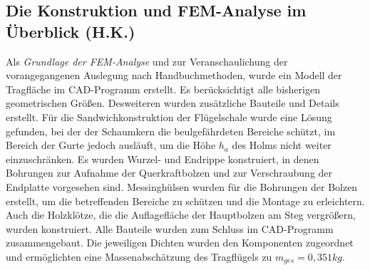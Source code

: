 \subsection{Die Konstruktion und FEM-Analyse im Überblick (H.K.)}
Als \textit{Grundlage der FEM-Analyse} und zur Veranschaulichung der vorangegangenen Auslegung nach Handbuchmethoden, wurde ein Modell der Tragfläche im CAD-Programm erstellt. Es berücksichtigt alle bisherigen geometrischen Größen. Desweiteren wurden zusätzliche Bauteile und Details erstellt. Für die Sandwichkonstruktion der Flügelschale wurde eine Lösung gefunden, bei der der Schaumkern die beulgefährdeten Bereiche schützt, im Bereich der Gurte jedoch ausläuft, um die Höhe $ h_{a} $ des Holms nicht weiter einzuschränken. Es wurden Wurzel- und Endrippe konstruiert, in denen Bohrungen zur Aufnahme der Querkraftbolzen und zur Verschraubung der Endplatte vorgesehen sind. Messinghülsen wurden für die Bohrungen der Bolzen erstellt, um die betreffenden Bereiche zu schützen und die Montage zu erleichtern. Auch die Holzklötze, die die Auflagefläche der Hauptbolzen am Steg vergrößern, wurden konstruiert. Alle Bauteile wurden zum Schluss im CAD-Programm zusammengebaut. Die jeweiligen Dichten wurden den Komponenten zugeordnet und ermöglichten eine Massenabschätzung des Tragflügels zu $ m_{ges}=0,351kg $. \\

